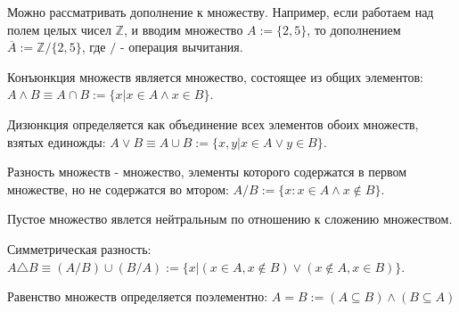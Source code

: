 Можно рассматривать дополнение к множеству. Например, если работаем над полем целых чисел $\mathbb{Z}$, и вводим множество $A:=\{2,5\}$, то дополнением $\overline{A}:=\mathbb{Z}/\{2,5\}$, где $/$ - операция вычитания.

Конъюнкция множеств является множество, состоящее из общих элементов: $A\wedge B \equiv A\cap B := \{x| x\in A \wedge x\in B\}$.

Дизюнкция определяется как объединение всех элементов обоих множеств, взятых единожды: $A\vee B \equiv A\cup B := \{x,y| x\in A \vee y\in B\}$.

Разность множеств - множество, элементы которого содержатся в первом множестве, но не содержатся во мтором: $A/B := \{x: x\in A \wedge x\notin B\}$.

Пустое множество явлется нейтральным по отношению к сложению множеством.

Симметрическая разность: $A\triangle B \equiv( A/B) \cup (B/A):= \{x| (x\in A, x\notin B )\vee (x\notin A, x\in B)\}$.

Равенство множеств определяется поэлементно: $A=B:= (A\subseteq B) \wedge (B\subseteq A)$